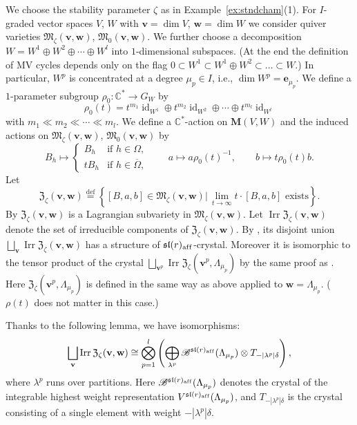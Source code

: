 \documentclass[10pt,a4paper]{amsart}
\theoremstyle{definition}
\numberwithin{equation}{section}
\newcommand{\defeq}{\overset{\operatorname{\scriptstyle def}}{=}}
\newcommand{\C}{{\mathbb C}}
\newcommand{\algsl}{\operatorname{\mathfrak{sl}}} %
\newcommand{\id}{\operatorname{id}}
\newcommand{\bM}{{\mathbf M}} %
\newcommand{\M}{{\mathfrak M}} %
\newcommand{\bv}{{\mathbf v}} %
\newcommand{\bw}{{\mathbf w}} %
\newcommand{\be}{{\mathbf e}}
\newcommand{\Irr}{\operatorname{Irr}}
\newcommand{\aff}{\mathrm{af\/f}}
\begin{document}
We choose the stability parameter $\zeta$ as in
Example~\ref{ex:stndcham}(1). For $I$-graded vector spaces $V$, $W$
with $\bv = \dim V$, $\bw = \dim W$ we
consider quiver varieties $\M_\zeta(\bv,\bw)$, $\M_0(\bv,\bw)$. We further
choose a decomposition
$W = W^1\oplus W^2\oplus \cdots \oplus W^l$ into $1$-dimensional
subspaces. (At the end the def\/inition of MV cycles depends only on the
f\/lag $0\subset W^1\subset W^1\oplus W^2 \subset \dots \subset W$.)
In particular, $W^p$ is concentrated at a degree $\mu_p\in I$, i.e.,
$\dim W^p = \be_{\mu_p}$.
%
We def\/ine a $1$-parameter subgroup $\rho_0\colon\C^*\to G_W$ by
\begin{equation*}
  \rho_0(t) = t^{m_1} \id_{W^1} \oplus t^{m_2} \id_{W^2} \oplus\cdots
  \oplus t^{m_l}\id_{W^l}
\end{equation*}
with $m_1 \ll m_2 \ll \cdots \ll m_l$. We def\/ine a $\C^*$-action on
$\bM(V,W)$ and the induced actions on $\M_\zeta(\bv,\bw)$, $\M_0(\bv,\bw)$ by
\begin{equation*}
   B_h \mapsto
   \begin{cases}
     B_h & \text{if $h\in\Omega$},
     \\
     t B_h & \text{if $h\in\overline\Omega$},
   \end{cases}
\qquad
   a \mapsto a \rho_0(t)^{-1},
\qquad
   b \mapsto t\rho_0(t)b.
\end{equation*}
Let
\begin{equation*}
  \mathfrak Z_\zeta(\bv,\bw) \defeq
  \left\{ [B,a,b]\in\M_\zeta(\bv,\bw) \big|\,
      \text{$\displaystyle\lim_{t\to \infty} t\cdot[B,a,b]$ exists}
       \right\}.
\end{equation*}
By \cite[\S~8]{Na-tensor} $\mathfrak Z_\zeta(\bv,\bw)$ is a Lagrangian
subvariety in $\M_\zeta(\bv,\bw)$.
%
Let $\Irr\mathfrak Z_\zeta(\bv,\bw)$ denote the set
of irreducible components of $\mathfrak Z_\zeta(\bv,\bw)$.
By \cite[\S~8]{Na-tensor}, its disjoint union
\(
   \bigsqcup_\bv \Irr\mathfrak Z_\zeta(\bv,\bw)
\)
has a structure of $\algsl(r)_\aff$-crystal. Moreover it is
isomorphic to the tensor product of the crystal
\(
   \bigsqcup_{\bv^p} \Irr\mathfrak Z_\zeta(\bv^p,\Lambda_{\mu_p})
\)
by the same proof as \cite[4.6]{Na-tensor}.
%
Here $\mathfrak Z_\zeta(\bv^p,\Lambda_{\mu_p})$ is def\/ined in the same
way as above applied to $\bw = \Lambda_{\mu_p}$. ($\rho(t)$ does not
matter in this case.)

Thanks to the following lemma, we have isomorphisms:
\begin{equation}\label{eq:tensor_Fock}
\begin{split}
  \bigsqcup_{\bv} \Irr\mathfrak Z_\zeta(\bv,\bw)
  \cong \bigotimes_{p=1}^l \left(
    \bigoplus_{\lambda^p}
  \mathscr B^{{\algsl}(r)_\aff}(\Lambda_{\mu_p})
  \otimes T_{-|\lambda^p|\delta}
  \right),
\end{split}
\end{equation}
where $\lambda^p$ runs over partitions. Here $\mathscr
B^{{\algsl}(r)_\aff}(\Lambda_{\mu_p})$ denotes the crystal of the
integrable highest weight representation
$V^{{\algsl}(r)_\aff}(\Lambda_{\mu_p})$, and $T_{-|\lambda^p|\delta}$
is the crystal consisting of a single element with weight
$-|\lambda^p|\delta$.
\end{document}
